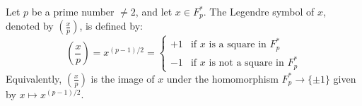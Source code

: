 Let $p$ be a prime number $\neq 2$, and let $x \in F_p^*$. The Legendre symbol of $x$, denoted by $\left(\frac{x}{p}\right)$, is defined by:
$$\left(\frac{x}{p}\right) = x^{(p-1)/2} = \begin{cases} +1 & \text{if $x$ is a square in $F_p^*$} \\ -1 & \text{if $x$ is not a square in $F_p^*$} \end{cases}$$
Equivalently, $\left(\frac{x}{p}\right)$ is the image of $x$ under the homomorphism $F_p^* \to \{\pm 1\}$ given by $x \mapsto x^{(p-1)/2}$.
